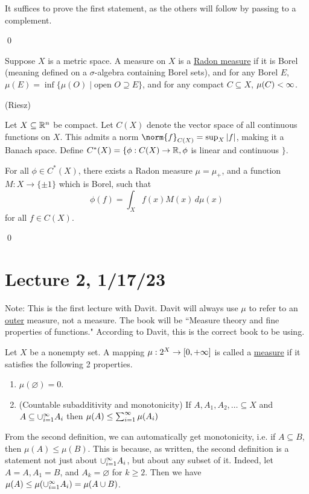 \documentclass[x11names,reqno,14pt]{extarticle}
\newcommand{\seq}[1]{_{#1 = 1}^\oo}
\begin{document}
\proof

It suffices to prove the first statement, as the others will follow by passing to a complement. 

\qed


Suppose $X$ is a metric space. A measure on $X$ is a \underline{Radon measure} if it is Borel (meaning defined on a $\sigma$-algebra containing Borel sets), and for any Borel $E$, $\mu(E) = \inf\{\mu(O) \mid \text{open }O \supseteq E\}$, and for any compact $C\subseteq X$, $\mu(C)<\infty$. 

\thm (Riesz)

Let $X \subseteq \mathbb{R}^n$ be compact. Let $C(X)$ denote the vector space of all continuous functions on $X$. This admits a norm $\norm{f}_{C(X)} = \sup_X|f|$, making it a Banach space. Define $C^*(X) = \{\phi:C(X)\to\mathbb{R}, \phi$ is linear and continuous $\}$. 

For all $\phi \in C^*(X)$, there exists a Radon measure $\mu = \mu_+$, and a function $M:X\to\{\pm1\}$ which is Borel, such that
\[
\phi(f) = \int_Xf(x)M(x)\,d\mu(x)
\]
for all $f \in C(X)$. 

\proof

\qed

\section*{Lecture 2, 1/17/23}

Note: This is the first lecture with Davit. Davit will always use $\mu$ to refer to an \underline{outer} measure, not a measure. The book will be ``Measure theory and fine properties of functions." According to Davit, this is the correct book to be using. 


Let $X$ be a nonempty set. A mapping $\mu:2^X\to[0,+\infty]$ is called a \underline{measure} if it satisfies the following 2 properties.

\begin{enumerate}
\item $\mu(\varnothing) = 0$. 
\item (Countable subadditivity and monotonicity) If $A, A_1, A_2, \dots \subseteq X$ and $A \subseteq \cup\seq{i}A_i$ then $\mu(A)\leq\sum\seq{i}\mu(A_i)$
\end{enumerate}

\rem From the second definition, we can automatically get monotonicity, i.e. if $A\subseteq B$, then $\mu(A)\leq\mu(B)$. This is because, as written, the second definition is a statement not just about $\cup\seq{i}A_i$, but about any subset of it. Indeed, let $A = A, A_1 = B$, and $A_k = \varnothing$ for $k\geq 2$. Then we have $\mu(A)\leq\mu(\cup\seq{i}A_i) = \mu(A\cup B)$. 
\end{document}

